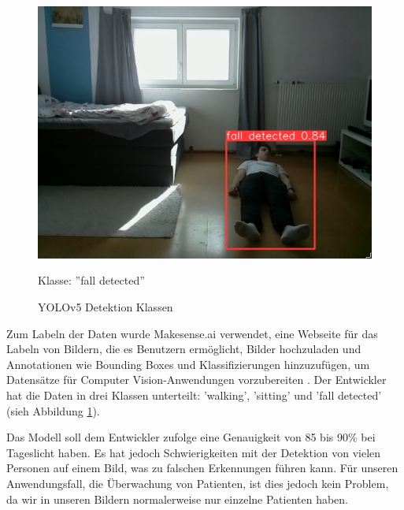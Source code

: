\begin{figure}[H]
\begin{minipage}[b]{0.3\textwidth}
		\includegraphics[width=\textwidth]{images/fallen.png}
		\caption*{Klasse: ''fall detected''}
	\end{minipage}
	\caption{YOLOv5 Detektion Klassen}
	\label{fig:yolo_classes}
\end{figure}


Zum Labeln der Daten wurde Makesense.ai verwendet, eine Webseite für das Labeln von Bildern, die es Benutzern ermöglicht, Bilder hochzuladen und Annotationen wie Bounding Boxes und Klassifizierungen hinzuzufügen, um Datensätze für Computer Vision-Anwendungen vorzubereiten \cite{noauthor_make_nodate}. Der Entwickler hat die Daten in drei Klassen unterteilt: 'walking', 'sitting' und 'fall detected' (sieh Abbildung \ref{fig:yolo_classes}).


Das Modell soll dem Entwickler zufolge eine Genauigkeit von 85 bis 90\% bei Tageslicht haben. Es hat jedoch Schwierigkeiten mit der Detektion von vielen Personen auf einem Bild, was zu falschen Erkennungen führen kann. Für unseren Anwendungsfall, die Überwachung von Patienten, ist dies jedoch kein Problem, da wir in unseren Bildern normalerweise nur einzelne Patienten haben.


